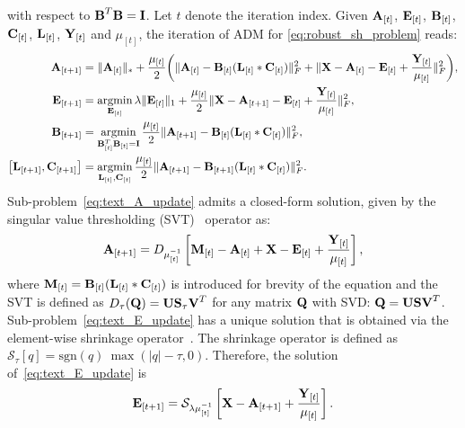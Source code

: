 with respect to $\boldsymbol{\mathbf{B}}^T \boldsymbol{\mathbf{B}} = \boldsymbol{\mathbf{I}}$. Let $t$ denote the iteration index. 
Given $\boldsymbol{\mathbf{A}}_{[t]}$, $\boldsymbol{\mathbf{E}}_{[t]}$, $\boldsymbol{\mathbf{B}}_{[t]}$, $\boldsymbol{\mathbf{C}}_{[t]}$, $\boldsymbol{\mathbf{L}}_{[t]}$, $\boldsymbol{\mathbf{Y}}_{[t]}$
and $\mu_{[t]}$, the iteration of ADM for \cref{eq:robust_sh_problem} reads:
\begin{align}
    \bb{A}_{[t+1]} &= \lVert \bb{A}_{[t]} \rVert_{*} + \frac{\mu_{[t]}}{2} \biggl( \lVert \bb{A}_{[t]} - \bb{B}_{[t]} (\bb{L}_{[t]} \ast \bb{C}_{[t]}) \rVert^{2}_{F} + \lVert \bb{X} - \bb{A}_{[t]} - \bb{E}_{[t]} + \frac{\bb{Y}_{[t]}}{\mu_{[t]}} \rVert_{F}^{2} \biggr), \label{eq:text_A_update} \\
    \bb{E}_{[t+1]} &= \argmin_{\bb{E}_{[t]}} \lambda \lVert \bb{E}_{[t]} \rVert_{1} + \frac{\mu_{[t]}}{2} \lVert \bb{X} - \bb{A}_{[t+1]} - \bb{E}_{[t]} + \frac{\bb{Y}_{[t]}}{\mu_{[t]}} \rVert_{F}^{2}, \label{eq:text_E_update} \\
    \bb{B}_{[t+1]} &= \argmin_{\bb{B}_{[t]}^T \bb{B}_{[t]} = \bb{I}} \frac{\mu_{[t]}}{2} \lVert \bb{A}_{[t+1]} - \bb{B}_{[t]} (\bb{L}_{[t]} \ast \bb{C}_{[t]}) \rVert_{F}^{2}, \label{eq:text_B_update} \\
    \left[ \bb{L}_{[t+1]}, \bb{C}_{[t+1]} \right] &= \argmin_{\bb{L}_{[t]}, \bb{C}_{[t]}} \frac{\mu_{[t]}}{2} \lVert \bb{A}_{[t+1]} - \bb{B}_{[t+1]} (\bb{L}_{[t]} \ast \bb{C}_{[t]}) \rVert_{F}^{2}. \label{eq:text_LC_update}
\end{align}
Sub-problem~\eqref{eq:text_A_update} admits a closed-form solution, given by the
singular value thresholding (SVT)~\cite{cai2010singular} operator as:
\begin{equation}\label{eq:text_A_SVT}
    \boldsymbol{\mathbf{A}}_{[t+1]} = D_{\mu_{[t]}^{-1}} \left[ \boldsymbol{\mathbf{M}}_{[t]}  - \boldsymbol{\mathbf{A}}_{[t]} + \boldsymbol{\mathbf{X}} - \boldsymbol{\mathbf{E}}_{[t]} + \frac{\boldsymbol{\mathbf{Y}}_{[t]}}{\mu_{[t]}} \right],
\end{equation}
where $\boldsymbol{\mathbf{M}}_{[t]} = \boldsymbol{\mathbf{B}}_{[t]} (\boldsymbol{\mathbf{L}}_{[t]} \ast \boldsymbol{\mathbf{C}}_{[t]})$ is introduced 
for brevity of the equation and the SVT is defined as
$D_{\tau}(\boldsymbol{\mathbf{Q}}) = \boldsymbol{\mathbf{U}} \boldsymbol{\mathbf{S}}_{\tau} \boldsymbol{\mathbf{V}}^T$ for any matrix $\boldsymbol{\mathbf{Q}}$ with SVD:\@
$\boldsymbol{\mathbf{Q}} = \boldsymbol{\mathbf{U}} \boldsymbol{\mathbf{S}} \boldsymbol{\mathbf{V}}^T$. 
Sub-problem~\eqref{eq:text_E_update} has a unique solution that is obtained via 
the element-wise shrinkage operator~\cite{candes2011robust}. The shrinkage operator 
is defined as $\mathcal{S}_{\tau}[q]=\mbox{sgn}(q) \: \max(|q|-\tau, 0)$. 
Therefore, the solution of~\eqref{eq:text_E_update} is
\begin{equation}\label{eq:text_E_shrinkage}
    \boldsymbol{\mathbf{E}}_{[t+1]} = \mathcal{S}_{\lambda \mu_{[t]}^{-1}} \left[ \boldsymbol{\mathbf{X}} - \boldsymbol{\mathbf{A}}_{[t+1]} + \frac{\boldsymbol{\mathbf{Y}}_{[t]}}{\mu_{[t]}} \right].
\end{equation}
